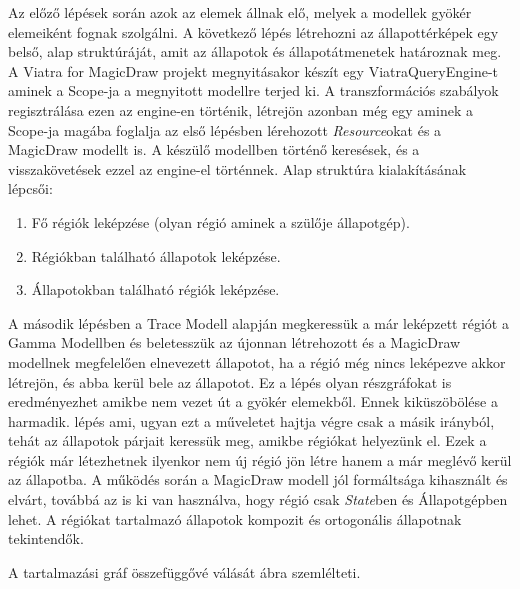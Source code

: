 Az előző lépések során azok az elemek állnak elő, melyek a modellek gyökér elemeiként fognak szolgálni. A következő lépés létrehozni az állapottérképek egy belső, alap struktúráját, amit az állapotok és állapotátmenetek határoznak meg. A Viatra for MagicDraw projekt megnyitásakor készít egy ViatraQueryEngine-t aminek a Scope-ja a megnyitott modellre terjed ki. A transzformációs szabályok regisztrálása ezen az engine-en történik, létrejön azonban még egy aminek a Scope-ja magába foglalja az első lépésben lérehozott \emph{Resource}okat és a MagicDraw modellt is. A készülő modellben történő keresések, és a visszakövetések ezzel az engine-el történnek. Alap struktúra kialakításának lépcsői:

\begin{enumerate}
	\item Fő régiók leképzése (olyan régió aminek a szülője állapotgép).
	\label{enum:elso}
	\item Régiókban található állapotok leképzése.
	\label{enum:masodik}
	\item Állapotokban található régiók leképzése.
	\label{enum:harmadik}
\end{enumerate}


A második lépésben a Trace Modell alapján megkeressük a már leképzett régiót a Gamma Modellben és beletesszük az újonnan létrehozott és a MagicDraw modellnek megfelelően elnevezett állapotot, ha a régió még nincs leképezve akkor létrejön, és abba kerül bele az állapotot. Ez a lépés olyan részgráfokat is eredményezhet amikbe nem vezet út a gyökér elemekből. Ennek kiküszöbölése a harmadik. lépés ami, ugyan ezt a műveletet hajtja végre csak a másik irányból, tehát az állapotok párjait keressük meg, amikbe régiókat helyezünk el. Ezek a régiók már létezhetnek ilyenkor nem új régió jön létre hanem a már meglévő kerül az állapotba. A működés során a MagicDraw modell jól formáltsága kihasznált és elvárt, továbbá az is ki van használva, hogy régió csak \emph{State}ben és Állapotgépben lehet. A régiókat tartalmazó állapotok kompozit és ortogonális állapotnak tekintendők.

A tartalmazási gráf összefüggővé válását  ábra szemlélteti.

